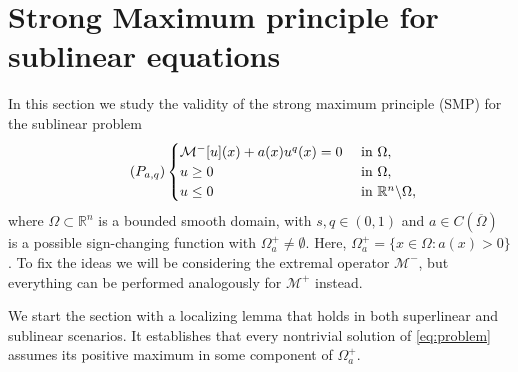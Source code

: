\documentclass[11pt]{article}
\begin{document}


\section{Strong Maximum principle for sublinear equations}\label{secciondeadcore}


In this section we study the validity of the strong maximum principle (SMP)  for the sublinear problem
\begin{equation*}\label{eq:problem}\tag{$P_{a,q}$}
\begin{cases}
    \mathcal{M}^{-}[u](x) + a(x)u^{q}(x) = 0 & \text{ in } \Omega, \\ 
    u\geq 0 & \text{ in }\Omega, \\
     u \leq 0 & \text{ in } \mathbb{R}^{n}\backslash\Omega, \\
\end{cases}
\end{equation*}
where \(\Omega\subset\mathbb{R}^n\) is a bounded smooth domain, with $s, q\in(0,1)$ and $a\in C(\overline{\Omega})$ is a possible sign-changing function with $\Omega^+_a\neq \emptyset$. 
Here, $\Omega^+_a=\{x\in \Omega: a(x)>0\}$. 
To fix the ideas we will be considering  the extremal operator $\mathcal{M}^{-}$, but everything can be performed analogously for  
$\mathcal{M}^{+}$ instead.

We start the section with a localizing lemma that holds in both superlinear and sublinear scenarios. It establishes that every nontrivial solution of \eqref{eq:problem} assumes its positive maximum in some component of $\Omega^{+}_a$.
\end{document}

